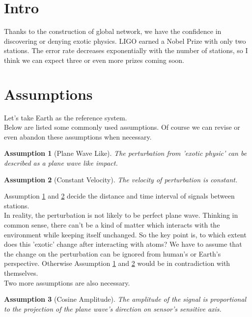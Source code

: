 \documentclass[
12pt, %
a4paper %
]{extreport}
\theoremstyle{plain}
\newtheorem{assumption}{Assumption}
\let\origtheassumption\theassumption
\begin{document}
\section{Intro}
Thanks to the construction of global network, we have the confidence in discovering or denying exotic physics. LIGO earned a Nobel Prize with only two stations. The error rate decreases exponentially with the number of stations, so I think we can expect three or even more prizes coming soon.
\section{Assumptions}
Let's take Earth as the reference system. \\%
Below are listed some commonly used assumptions. Of course we can revise or even abandon these assumptions when necessary.
\edef\oldassumption{\the\numexpr\value{assumption}+1}
\setcounter{assumption}{0}
\renewcommand{\theassumption}{\oldassumption.\alph{assumption}}
\begin{assumption}[Plane Wave Like]\label{as:PlaneWaveLike}%
	The perturbation from 'exotic physic' can be described as a plane wave like impact.
\end{assumption}
\begin{assumption}[Constant Velocity]\label{as:ConstantVelocity}%
	The velocity of perturbation is constant.
\end{assumption}%
\noindent Assumption \ref{as:PlaneWaveLike} and \ref{as:ConstantVelocity} decide the distance and time interval of signals between stations. \\
In reality, the perturbation is not likely to be perfect plane wave. Thinking in common sense, there can't be a kind of matter which interacts with the environment while keeping itself unchanged. So the key point is, to which extent does this 'exotic' change after interacting with atoms? We have to assume that the change on the perturbation can be ignored from human’s or Earth’s perspective. Otherwise Assumption \ref{as:PlaneWaveLike} and \ref{as:ConstantVelocity} would be in contradiction with themselves. \\
Two more assumptions are also necessary. 
\edef\oldassumption{\the\numexpr\value{assumption}+1}
\setcounter{assumption}{0}
\renewcommand{\theassumption}{\oldassumption.\alph{assumption}}
\begin{assumption}[Cosine Amplitude]\label{as:CosineAmplitude}
	The amplitude of the signal is proportional to the projection of the plane wave's direction on sensor's sensitive axis.
\end{assumption}
\end{document}
